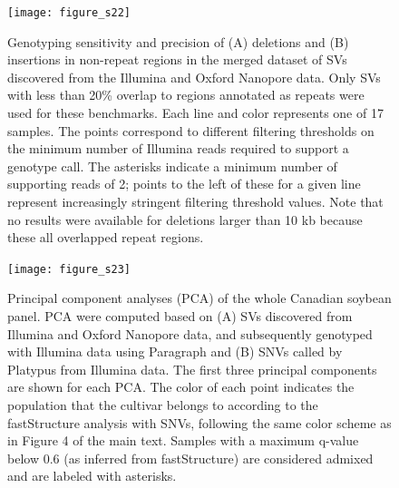 \documentclass[12pt]{article}
\newenvironment{cfigure}
	{\begin{figure} \centering}
	{\end{figure}}
\newenvironment{lsfigure}
	{\begin{landscape} \begin{figure} \centering}
	{\end{figure} \end{landscape}}
\begin{document}
\begin{lsfigure}
	\texttt{[image: figure\_s22]}

	\caption[Sensitivity and precision of joint Illumina/Oxford Nanopore deletion and insertion genotyping in non-repeat regions]{
		Genotyping sensitivity and precision of (A) deletions and (B) insertions in non-repeat regions in the merged dataset of SVs discovered from the Illumina and Oxford Nanopore data. 
		Only SVs with less than 20\% overlap to regions annotated as repeats were used for these benchmarks. 
		Each line and color represents one of 17 samples. 
		The points correspond to different filtering thresholds on the minimum number of Illumina reads required to support a genotype call.
		The asterisks indicate a minimum number of supporting reads of 2; points to the left of these for a given line represent increasingly stringent filtering threshold values.
		Note that no results were available for deletions larger than 10 kb because these all overlapped repeat regions.
	}

	\label{fig_s22}
\end{lsfigure}

\clearpage%

\begin{cfigure}
	\texttt{[image: figure\_s23]}

	\caption[Principal component analyses (PCA) of the whole Canadian soybean panel]{
		Principal component analyses (PCA) of the whole Canadian soybean panel.
		PCA were computed based on (A) SVs discovered from Illumina and Oxford Nanopore data, and subsequently genotyped with Illumina data using Paragraph and (B) SNVs called by Platypus from Illumina data.
		The first three principal components are shown for each PCA. 
		The color of each point indicates the population that the cultivar belongs to according to the fastStructure analysis with SNVs, following the same color scheme as in Figure 4 of the main text.
		Samples with a maximum q-value below 0.6 (as inferred from fastStructure) are considered admixed and are labeled with asterisks.
	}

	\label{fig_s23}

\end{cfigure}
\end{document}
